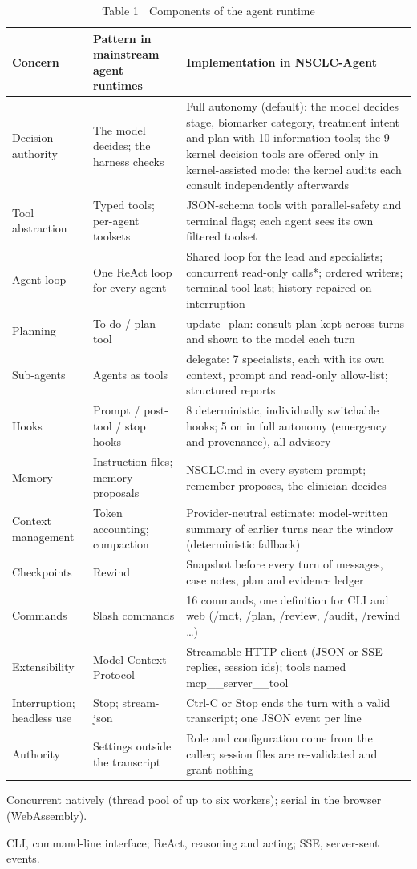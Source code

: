 \begin{table}[t]
\small
\caption{Table 1 | Components of the agent runtime}
\begin{tabular}{p{2.6cm}p{4.0cm}p{8.4cm}}
\toprule
Concern & Pattern in mainstream agent runtimes & Implementation in NSCLC-Agent \\
\midrule
Decision authority & The model decides; the harness checks & Full autonomy (default): the model decides stage, biomarker category, treatment intent and plan with 10 information tools; the 9 kernel decision tools are offered only in kernel-assisted mode; the kernel audits each consult independently afterwards \\
Tool abstraction & Typed tools; per-agent toolsets & JSON-schema tools with parallel-safety and terminal flags; each agent sees its own filtered toolset \\
Agent loop & One ReAct loop for every agent & Shared loop for the lead and specialists; concurrent read-only calls*; ordered writers; terminal tool last; history repaired on interruption \\
Planning & To-do / plan tool & update\_plan: consult plan kept across turns and shown to the model each turn \\
Sub-agents & Agents as tools & delegate: 7 specialists, each with its own context, prompt and read-only allow-list; structured reports \\
Hooks & Prompt / post-tool / stop hooks & 8 deterministic, individually switchable hooks; 5 on in full autonomy (emergency and provenance), all advisory \\
Memory & Instruction files; memory proposals & NSCLC.md in every system prompt; remember proposes, the clinician decides \\
Context management & Token accounting; compaction & Provider-neutral estimate; model-written summary of earlier turns near the window (deterministic fallback) \\
Checkpoints & Rewind & Snapshot before every turn of messages, case notes, plan and evidence ledger \\
Commands & Slash commands & 16 commands, one definition for CLI and web (/mdt, /plan, /review, /audit, /rewind …) \\
Extensibility & Model Context Protocol & Streamable-HTTP client (JSON or SSE replies, session ids); tools named mcp\_\_server\_\_tool \\
Interruption; headless use & Stop; stream-json & Ctrl-C or Stop ends the turn with a valid transcript; one JSON event per line \\
Authority & Settings outside the transcript & Role and configuration come from the caller; session files are re-validated and grant nothing \\
\bottomrule
\end{tabular}
\par\footnotesize *Concurrent natively (thread pool of up to six workers); serial in the browser (WebAssembly).
\par\footnotesize CLI, command-line interface; ReAct, reasoning and acting; SSE, server-sent events.
\end{table}
